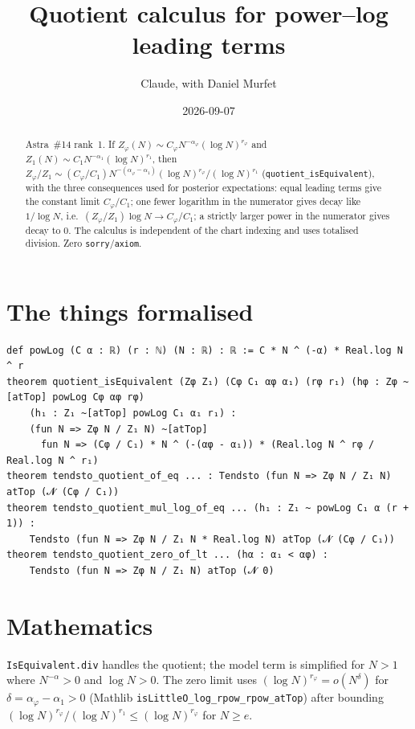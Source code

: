 \documentclass[11pt]{article}
\title{Quotient calculus for power--log leading terms}
\author{Claude, with Daniel Murfet}
\date{2026-09-07}
\begin{document}
\maketitle
\sloppy

\begin{abstract}
Astra~\#14 rank~1. If $Z_\varphi(N)\sim C_\varphi N^{-\alpha_\varphi}(\log N)^{r_\varphi}$ and
$Z_1(N)\sim C_1N^{-\alpha_1}(\log N)^{r_1}$, then
$Z_\varphi/Z_1\sim(C_\varphi/C_1)N^{-(\alpha_\varphi-\alpha_1)}(\log N)^{r_\varphi}/(\log N)^{r_1}$
(\texttt{quotient\_isEquivalent}), with the three consequences used for posterior expectations: equal
leading terms give the constant limit $C_\varphi/C_1$; one fewer logarithm in the numerator gives
decay like $1/\log N$, i.e.\ $(Z_\varphi/Z_1)\log N\to C_\varphi/C_1$; a strictly larger power in the
numerator gives decay to $0$. The calculus is independent of the chart indexing and uses totalised
division. Zero \texttt{sorry}/\texttt{axiom}.
\end{abstract}

\section{The things formalised}
{\small
\begin{verbatim}
def powLog (C α : ℝ) (r : ℕ) (N : ℝ) : ℝ := C * N ^ (-α) * Real.log N ^ r
theorem quotient_isEquivalent (Zφ Z₁) (Cφ C₁ αφ α₁) (rφ r₁) (hφ : Zφ ~[atTop] powLog Cφ αφ rφ)
    (h₁ : Z₁ ~[atTop] powLog C₁ α₁ r₁) :
    (fun N => Zφ N / Z₁ N) ~[atTop]
      fun N => (Cφ / C₁) * N ^ (-(αφ - α₁)) * (Real.log N ^ rφ / Real.log N ^ r₁)
theorem tendsto_quotient_of_eq ... : Tendsto (fun N => Zφ N / Z₁ N) atTop (𝓝 (Cφ / C₁))
theorem tendsto_quotient_mul_log_of_eq ... (h₁ : Z₁ ~ powLog C₁ α (r + 1)) :
    Tendsto (fun N => Zφ N / Z₁ N * Real.log N) atTop (𝓝 (Cφ / C₁))
theorem tendsto_quotient_zero_of_lt ... (hα : α₁ < αφ) :
    Tendsto (fun N => Zφ N / Z₁ N) atTop (𝓝 0)
\end{verbatim}
}

\section{Mathematics}
\texttt{IsEquivalent.div} handles the quotient; the model term is simplified for $N>1$ where
$N^{-\alpha}>0$ and $\log N>0$. The zero limit uses $(\log N)^{r_\varphi}=o(N^{\delta})$ for
$\delta=\alpha_\varphi-\alpha_1>0$ (Mathlib \texttt{isLittleO\_log\_rpow\_rpow\_atTop}) after bounding
$(\log N)^{r_\varphi}/(\log N)^{r_1}\le(\log N)^{r_\varphi}$ for $N\ge e$.
\end{document}
